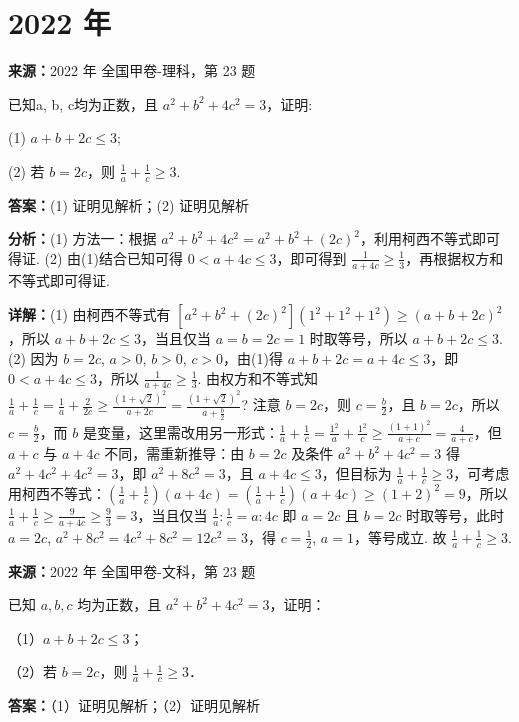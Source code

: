 \section*{2022 年}

\begin{question}[points=10]
\textbf{来源：}2022 年 全国甲卷-理科，第 23 题\par
已知a, b, c均为正数，且 $a^2+b^2+4c^2=3$，证明:

(1) $a+b+2c\leq 3$;

(2) 若 $b=2c$，则 $\frac{1}{a}+\frac{1}{c}\geq 3$.
\begin{solution}
\textbf{答案：}(1) 证明见解析；(2) 证明见解析

\textbf{分析：}(1) 方法一：根据 $a^2+b^2+4c^2=a^2+b^2+(2c)^2$，利用柯西不等式即可得证. (2) 由(1)结合已知可得 $0<a+4c\leq 3$，即可得到 $\frac{1}{a+4c}\geq \frac{1}{3}$，再根据权方和不等式即可得证.

\textbf{详解：}(1) 由柯西不等式有 $[a^2+b^2+(2c)^2](1^2+1^2+1^2)\geq (a+b+2c)^2$，所以 $a+b+2c\leq 3$，当且仅当 $a=b=2c=1$ 时取等号，所以 $a+b+2c\leq 3$.
(2) 因为 $b=2c$, $a>0$, $b>0$, $c>0$，由(1)得 $a+b+2c=a+4c\leq 3$，即 $0<a+4c\leq 3$，所以 $\frac{1}{a+4c}\geq \frac{1}{3}$. 由权方和不等式知 $\frac{1}{a}+\frac{1}{c}=\frac{1}{a}+\frac{2}{2c}\geq \frac{(1+\sqrt{2})^2}{a+2c}=\frac{(1+\sqrt{2})^2}{a+\frac{b}{2}}$? 注意 $b=2c$，则 $c=\frac{b}{2}$，且 $b=2c$，所以 $c=\frac{b}{2}$，而 $b$ 是变量，这里需改用另一形式：$\frac{1}{a}+\frac{1}{c}=\frac{1^2}{a}+\frac{1^2}{c}\geq \frac{(1+1)^2}{a+c}=\frac{4}{a+c}$，但 $a+c$ 与 $a+4c$ 不同，需重新推导：由 $b=2c$ 及条件 $a^2+b^2+4c^2=3$ 得 $a^2+4c^2+4c^2=3$，即 $a^2+8c^2=3$，且 $a+4c\leq 3$，但目标为 $\frac{1}{a}+\frac{1}{c}\geq 3$，可考虑用柯西不等式：$(\frac{1}{a}+\frac{1}{c})(a+4c)=(\frac{1}{a}+\frac{1}{c})(a+4c)\geq (1+2)^2=9$，所以 $\frac{1}{a}+\frac{1}{c}\geq \frac{9}{a+4c}\geq \frac{9}{3}=3$，当且仅当 $\frac{1}{a}:\frac{1}{c}=a:4c$ 即 $a=2c$ 且 $b=2c$ 时取等号，此时 $a=2c$, $a^2+8c^2=4c^2+8c^2=12c^2=3$，得 $c=\frac{1}{2}$, $a=1$，等号成立. 故 $\frac{1}{a}+\frac{1}{c}\geq 3$.
\end{solution}
\end{question}

\begin{question}[points=10]
\textbf{来源：}2022 年 全国甲卷-文科，第 23 题\par
[选修4-5：不等式选讲]

已知 $a,b,c$ 均为正数，且 $a^2+b^2+4c^2=3$，证明：

（1）$a+b+2c\le3$；

（2）若 $b=2c$，则 $\frac{1}{a}+\frac{1}{c}\ge3$．
\begin{solution}
\textbf{答案：}（1）证明见解析；（2）证明见解析
\end{solution}
\end{question}

